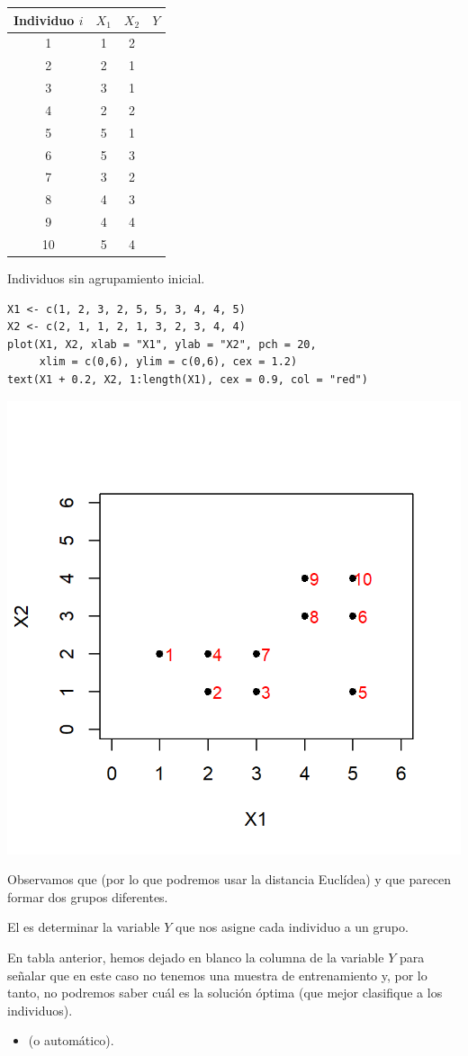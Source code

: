 \begin{center}
\begin{tabular}{c|ccc}
Individuo $i$ & $X_1$ & $X_2$ & $Y$ \\
\hline
1 & 1 & 2 &  \\
2 & 2 & 1 &  \\
3 & 3 & 1 &  \\
4 & 2 & 2 &  \\
5 & 5 & 1 &  \\
6 & 5 & 3 &  \\
7 & 3 & 2 &  \\
8 & 4 & 3 &  \\
9 & 4 & 4 &  \\
10 & 5 & 4 &  \\
\hline
\end{tabular}
\end{center}
Individuos sin agrupamiento inicial.
\begin{lstlisting}
X1 <- c(1, 2, 3, 2, 5, 5, 3, 4, 4, 5)
X2 <- c(2, 1, 1, 2, 1, 3, 2, 3, 4, 4)
plot(X1, X2, xlab = "X1", ylab = "X2", pch = 20, 
     xlim = c(0,6), ylim = c(0,6), cex = 1.2)
text(X1 + 0.2, X2, 1:length(X1), cex = 0.9, col = "red")
\end{lstlisting}
\begin{center}
\includegraphics[width=0.5\linewidth]{"Temas/Imágenes/Tema 6/screenshot001"}
\end{center}
Observamos que  (por lo que podremos usar la distancia Euclídea) y que parecen formar dos grupos diferentes.

El  es determinar la variable $Y$ que nos asigne cada individuo a un grupo.

En tabla anterior, hemos dejado en blanco la columna de la variable $Y$ para señalar que en este caso no tenemos una muestra de entrenamiento y, por lo tanto, no podremos saber cuál es la solución óptima (que mejor clasifique a los individuos).
\begin{itemize}
\item {} (o automático).
\end{itemize}

